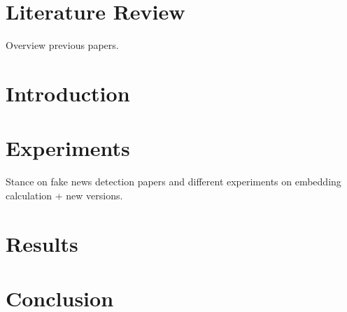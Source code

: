 \section{Literature Review}
Overview previous papers. 
\section{Introduction}
\section{Experiments}
Stance on fake news detection papers and different experiments on embedding calculation + new versions.
\section{Results}
\section{Conclusion}